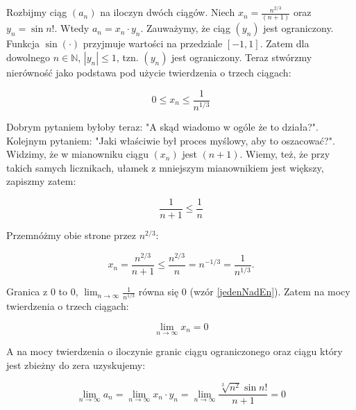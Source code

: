 \documentclass[a4paper,oneside,openright,11pt]{article}
\numberwithin{equation}{section}
\begin{document}
Rozbijmy ciąg $(a_n)$ na iloczyn dwóch ciągów. Niech $x_n = \frac{n^{2/3}}{(n+1)}$ oraz $y_n = \sin n!$. Wtedy $a_n = x_n \cdot y_n$. Zauważymy, że ciąg $(y_n)$ jest ograniczony.
Funkcja $\sin(\cdot)$ przyjmuje wartości na przedziale $[-1, 1]$. Zatem dla dowolnego $n \in \mathbb{N}$, $|y_n| \leq 1$, tzn. $(y_n)$ jest ograniczony. Teraz stwórzmy nierówność jako podstawa pod użycie
twierdzenia o trzech ciągach:

\begin{equation*}
    0 \leq x_n \leq \frac{1}{n^{1/3}}
\end{equation*}

Dobrym pytaniem byłoby teraz: "A skąd wiadomo w ogóle że to działa?". Kolejnym pytaniem: "Jaki właściwie był proces myślowy, aby to oszacować?". Widzimy, że w mianowniku ciągu $(x_n)$ jest $(n+1)$.
Wiemy, też, że przy takich samych licznikach, ułamek z mniejszym mianownikiem jest większy, zapiszmy zatem:

\begin{equation*}
    \frac{1}{n+1} \leq \frac{1}{n}
\end{equation*}

Przemnóżmy obie strone przez $n^{2/3}$:

\begin{equation*}
    x_n = \frac{n^{2/3}}{n+1} \leq \frac{n^{2/3}}{n} = n^{-1/3} = \frac{1}{n^{1/3}}.
\end{equation*}

Granica z $0$ to $0$, $\lim_{n\to\infty} \frac{1}{n^{1/3}}$ równa się $0$ (wzór \ref{jedenNadEn}). Zatem na mocy twierdzenia o trzech ciągach:

\begin{equation*}
    \lim_{n\to\infty} x_n = 0
\end{equation*}

\noindent
A na mocy twierdzenia o iloczynie granic ciągu ograniczonego oraz ciągu który jest zbieżny do zera uzyskujemy:

\begin{equation*}
    \lim_{n\to\infty} a_n = \lim_{n\to\infty} x_n \cdot y_n =\lim_{n\to\infty} \frac{\sqrt[3]{n^2} \sin n!}{n+1} = 0
\end{equation*}
\end{document}

